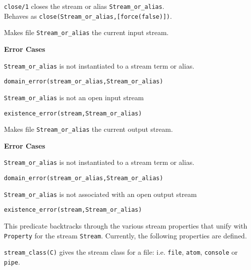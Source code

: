 \begin{description}
%
{\tt close/1} closes the stream or alias {\tt Stream\_or\_alias}.\\
Behaves as {\tt close(Stream\_or\_alias,[force(false)])}.

    Makes file {\tt Stream\_or\_alias} the current input stream. 

{\bf Error Cases}
\bi
\item 	{\tt Stream\_or\_alias} is not instantiated to a stream term
or alias.
\bi
\item 	{\tt domain\_error(stream\_or\_alias,Stream\_or\_alias)}
\ei
\item 	{\tt Stream\_or\_alias} is not an open input stream
\bi
\item 	{\tt existence\_error(stream,Stream\_or\_alias)}
\ei
\ei

    Makes file {\tt Stream\_or\_alias} the current output stream. 

{\bf Error Cases}
\bi
\item 	{\tt Stream\_or\_alias} is not instantiated to a stream term
or alias.
\bi
\item 	{\tt domain\_error(stream\_or\_alias,Stream\_or\_alias)}
\ei
\item 	{\tt Stream\_or\_alias} is not associated with an open output stream
\bi
\item 	{\tt existence\_error(stream,Stream\_or\_alias)}
\ei
\ei

%
This predicate backtracks through the various stream properties that
unify with {\tt Property} for the stream {\tt Stream}.  Currently,
the following properties are defined.

\bi
\item {\tt stream\_class(C)} gives the stream class for a file:
i.e. {\tt file}, {\tt atom}, {\tt console} or {\tt pipe}.


\end{description}
